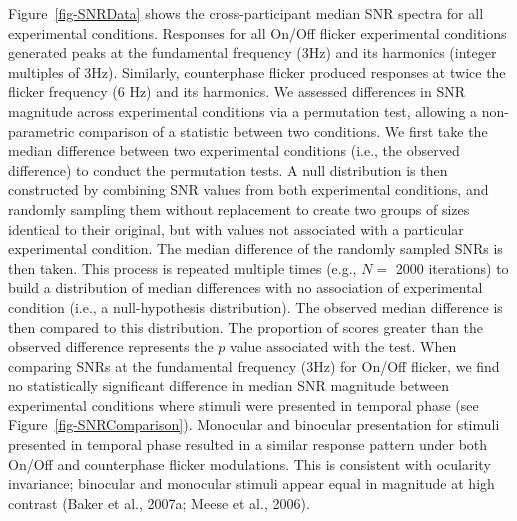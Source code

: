 \documentclass[review,
  12pt,
]{elsarticle}
\begin{document}
Figure~\ref{fig-SNRData} shows the cross-participant median SNR spectra
for all experimental conditions. Responses for all On/Off flicker
experimental conditions generated peaks at the fundamental frequency
(3Hz) and its harmonics (integer multiples of 3Hz). Similarly,
counterphase flicker produced responses at twice the flicker frequency
(6 Hz) and its harmonics. We assessed differences in SNR magnitude
across experimental conditions via a permutation test, allowing a
non-parametric comparison of a statistic between two conditions. We
first take the median difference between two experimental conditions
(i.e., the observed difference) to conduct the permutation tests. A null
distribution is then constructed by combining SNR values from both
experimental conditions, and randomly sampling them without replacement
to create two groups of sizes identical to their original, but with
values not associated with a particular experimental condition. The
median difference of the randomly sampled SNRs is then taken. This
process is repeated multiple times (e.g., \(N =\) 2000 iterations) to
build a distribution of median differences with no association of
experimental condition (i.e., a null-hypothesis distribution). The
observed median difference is then compared to this distribution. The
proportion of scores greater than the observed difference represents the
\(p\) value associated with the test. When comparing SNRs at the
fundamental frequency (3Hz) for On/Off flicker, we find no statistically
significant difference in median SNR magnitude between experimental
conditions where stimuli were presented in temporal phase (see
Figure~\ref{fig-SNRComparison}). Monocular and binocular presentation
for stimuli presented in temporal phase resulted in a similar response
pattern under both On/Off and counterphase flicker modulations. This is
consistent with ocularity invariance; binocular and monocular stimuli
appear equal in magnitude at high contrast (Baker et al., 2007a; Meese
et al., 2006).
\end{document}
